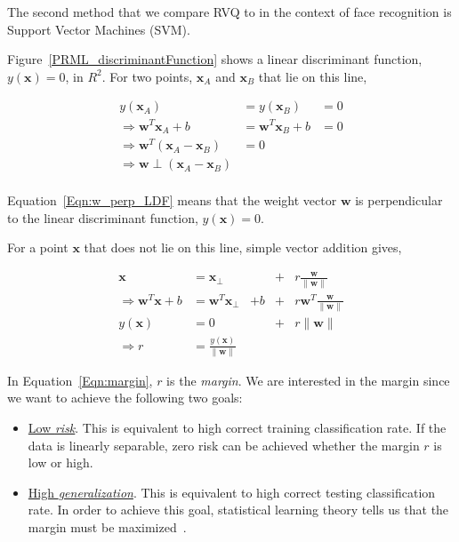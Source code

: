 The second method that we compare RVQ to in the context of face recognition is Support Vector Machines (SVM).  

Figure~\ref{PRML_discriminantFunction} shows a linear discriminant function, $y(\mathbf{x})=0$, in $R^2$.  For two points, $\mathbf{x}_A$ and $\mathbf{x}_B$ that lie on this line,

\begin{equation}
\begin{array}{lll}
y(\textbf{x}_A)					&=		y(\textbf{x}_B)					&=0\\
\Rightarrow \mathbf{w}^T\mathbf{x}_A+b	&=		\mathbf{w}^T\mathbf{x}_B+b	&=0\\
\Rightarrow \mathbf{w}^T(\mathbf{x}_A-\mathbf{x}_B)			&=0\\
\Rightarrow \mathbf{w} \perp (\mathbf{x}_A-\mathbf{x}_B)\\
\end{array}
\label{Eqn:w_perp_LDF}
\end{equation}

Equation~\ref{Eqn:w_perp_LDF} means that the weight vector $\mathbf{w}$ is perpendicular to the linear discriminant function, $y(\mathbf{x})=0$.  

For a point $\mathbf{x}$ that does not lie on this line, simple vector addition gives,

\begin{equation}
\begin{array}{clllll}
\mathbf{x}		&=\mathbf{x}_{\perp} &&+ &r\frac{\mathbf{w}}{\|\mathbf{w}\|}\\
\Rightarrow \mathbf{w}^T\mathbf{x} +b		&=\mathbf{w}^T\mathbf{x}_{\perp} &+ b &+ &r \mathbf{w}^T \frac{\mathbf{w}}{\|\mathbf{w}\|}\\
y(\mathbf{x}) &= 0 && + &r\|\mathbf{w}\|\\
\Rightarrow r&=\frac{y(\mathbf{x})}{\|\mathbf{w}\|}
\end{array}
\label{Eqn:margin}
\end{equation}

In Equation~\ref{Eqn:margin}, $r$ is the \emph{margin}.  We are interested in the margin since we want to achieve the following two goals:

\begin{itemize}
\item \underline{Low \emph{risk}}.  This is equivalent to high correct training classification rate.  If the data is linearly separable, zero risk can be achieved whether the margin $r$ is low or high.
\item \underline{High \emph{generalization}}.  This is equivalent to high correct testing classification rate.  In order to achieve this goal, statistical learning theory tells us that the margin must be maximized~\cite{1996_BOOK_PR_DevroyeGyorfiLugosi}.
\end{itemize}

